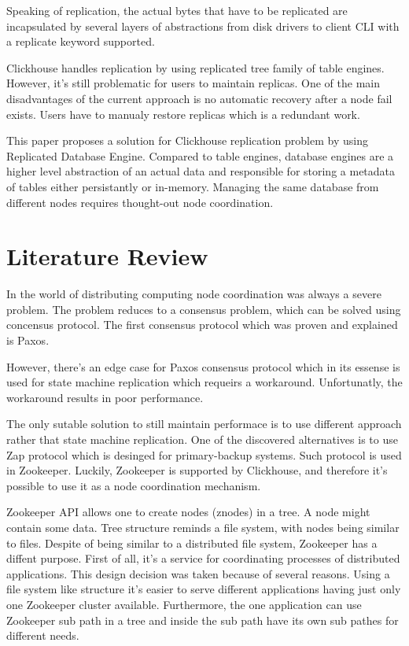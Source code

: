 \documentclass[conference]{IEEEtran}
\begin{document}
Speaking of replication, the actual bytes that have to be replicated are incapsulated
by several layers of abstractions from disk drivers to client CLI with a replicate
keyword supported.

Clickhouse handles replication by using replicated tree family of table engines.
However, it's still problematic for users to maintain replicas. One of the
main disadvantages of the current approach is no automatic recovery after a node fail exists.
Users have to manualy restore replicas which is a redundant work.

This paper proposes a solution for Clickhouse replication problem by using Replicated
Database Engine. Compared to table engines, database engines are a higher level abstraction
of an actual data and responsible for storing a metadata of tables either persistantly or
in-memory. Managing the same database from different nodes requires thought-out node coordination.

\section{Literature Review}
In the world of distributing computing node coordination was
always a severe problem. The problem reduces to a consensus
problem, which can be solved using concensus protocol. The first consensus
protocol which was proven and explained is Paxos\cite{paxos}.

However, there's an edge case for Paxos consensus protocol which in its essense is used for
state machine replication which requeirs a workaround\cite{zap}. Unfortunatly, the workaround
results in poor performance. 

The only sutable solution to still maintain performace is to use different approach
rather that state machine replication. One of the discovered alternatives is to use
Zap protocol which is desinged for primary-backup systems. Such protocol is used in
Zookeeper\cite{zookeeper}. Luckily, Zookeeper is supported by Clickhouse, and therefore
it's possible to use it as a node coordination mechanism.

Zookeeper API allows one to create nodes (znodes) in a tree. A node might contain some data.
Tree structure reminds a file system, with nodes being similar to files.
Despite of being similar to a distributed file system, Zookeeper has a diffent purpose.
First of all, it's a service for coordinating processes of distributed applications.
This design decision was taken because of several reasons. Using a file system like
structure it's easier to serve different applications having just only one Zookeeper cluster
available. Furthermore, the one application can use Zookeeper sub path in a tree
and inside the sub path have its own sub pathes for different needs.
\end{document}
